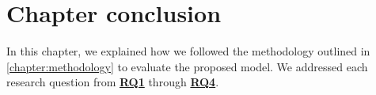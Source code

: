 




\section{Chapter conclusion}

In this chapter, we explained how we followed the methodology outlined in \cref{chapter:methodology} to evaluate the proposed model. We addressed each research question from \hyperref[rq1]{\textbf{RQ1}} through \hyperref[rq4]{\textbf{RQ4}}.

